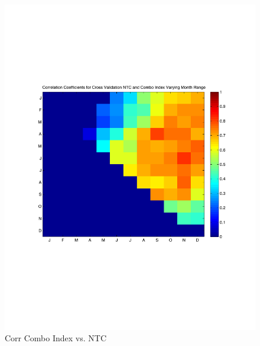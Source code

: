 \documentclass[]{article}
\begin{document}
\begin{figure}[ht]
\begin{minipage}[b]{0.6\linewidth}
\includegraphics[width=\textwidth]{figures/comboIndex/crossValidation/monthlySensitivityTestNTC.pdf}
\caption{Corr Combo Index vs. NTC}
\label{fig:figure39}
\end{minipage}
\hspace{0cm}
\begin{minipage}[b]{0.6\linewidth}

\end{minipage}
\end{figure}
\end{document}
